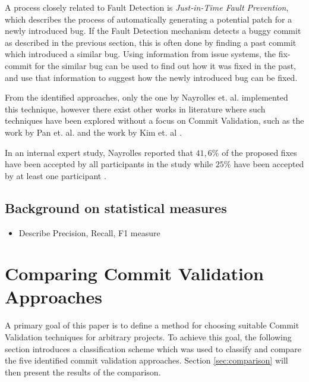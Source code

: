 A process closely related to Fault Detection is \textit{Just-in-Time Fault Prevention}, which describes the process of automatically generating a potential patch for a newly introduced bug. If the Fault Detection mechanism detects a buggy commit as described in the previous section, this is often done by finding a past commit which introduced a similar bug. Using information from issue systems, the fix-commit for the similar bug can be used to find out how it was fixed in the past, and use that information to suggest how the newly introduced bug can be fixed. \cite{Nayrolles2018}

From the identified approaches, only the one by Nayrolles et. al. implemented this technique, however there exist other works in literature where such techniques have been explored without a focus on Commit Validation, such as the work by Pan et. al. and the work by Kim et. al \cite{Nayrolles2018, Kim2013, Pan2009}.

In an internal expert study, Nayrolles reported that $41,6\%$ of the proposed fixes have been accepted by all participants in the study while $25\%$ have been accepted by at least one participant \cite{Nayrolles2018}.

\subsection{Background on statistical measures}

\begin{itemize}
	\item Describe Precision, Recall, F1 measure
\end{itemize}



\section{Comparing Commit Validation Approaches}
\label{sec:comparingapproaches}

A primary goal of this paper is to define a method for choosing suitable Commit Validation techniques for arbitrary projects. To achieve this goal, the following section introduces a classification scheme which was used to classify and compare the five identified commit validation approaches. Section \ref{sec:comparison} will then present the results of the comparison.

